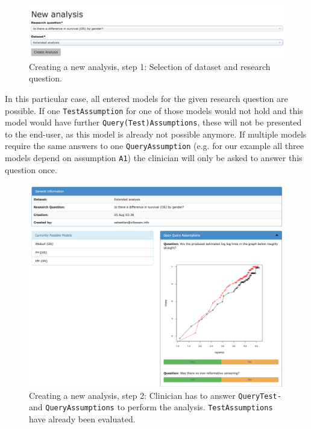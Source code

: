 \begin{figure}[b]
	\centering
	\includegraphics[width=\textwidth]{figures/ui_analysis_0}
	\caption{Creating a new analysis, step 1: Selection of dataset and research question. }
	\label{fig:analysis:1}
\end{figure}

In this particular case, all entered models for the given research question are possible. If one \texttt{TestAssumption} for one of those models would not hold and this model would have further \texttt{Query(Test)Assumptions}, these will not be presented to the end-user, as this model is already not possible anymore. If multiple models require the same answers to one \texttt{QueryAssumption} (e.g. for our example all three models depend on assumption \texttt{A1}) the clinician will only be asked to answer this question once. 

\begin{figure}[t]
	\centering
	\includegraphics[width=\textwidth]{figures/ui_analysis_1}
	\caption{Creating a new analysis, step 2: Clinician has to answer \texttt{QueryTest-} and \texttt{QueryAssumptions} to perform the analysis. \texttt{TestAssumptions} have already been evaluated.}
	\label{fig:analysis:2}
\end{figure}


